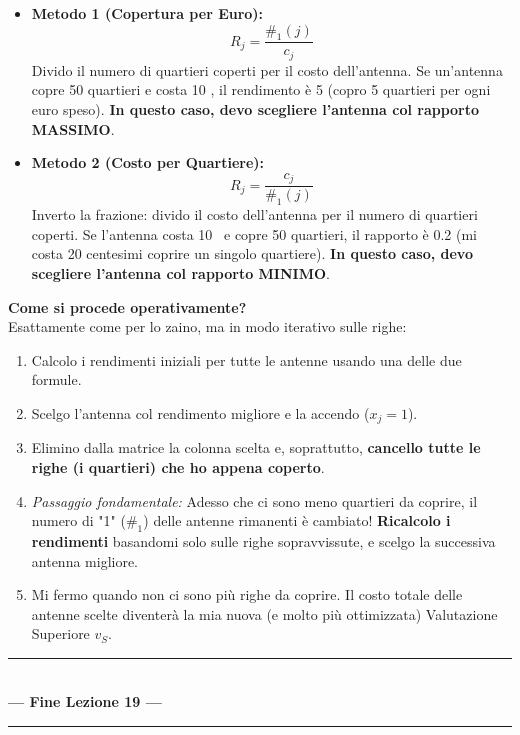 \documentclass[12pt, a4paper]{article}
\begin{document}
	\begin{itemize}[label=$\circ$, itemsep=4pt, leftmargin=1.5cm]
		\item \textbf{Metodo 1 (Copertura per Euro):}
		\[ R_j = \frac{\#_1(j)}{c_j} \]
		Divido il numero di quartieri coperti per il costo dell'antenna. Se un'antenna copre 50 quartieri e costa 10 \texteuro, il rendimento è 5 (copro 5 quartieri per ogni euro speso). \textbf{In questo caso, devo scegliere l'antenna col rapporto MASSIMO}.
		
		\item \textbf{Metodo 2 (Costo per Quartiere):}
		\[ R_j = \frac{c_j}{\#_1(j)} \]
		Inverto la frazione: divido il costo dell'antenna per il numero di quartieri coperti. Se l'antenna costa 10 \texteuro \ e copre 50 quartieri, il rapporto è 0.2 (mi costa 20 centesimi coprire un singolo quartiere). \textbf{In questo caso, devo scegliere l'antenna col rapporto MINIMO}.
	\end{itemize}
	
	\textbf{Come si procede operativamente?}\\
	Esattamente come per lo zaino, ma in modo iterativo sulle righe:
	\begin{enumerate}[label=\arabic*., itemsep=2pt]
		\item Calcolo i rendimenti iniziali per tutte le antenne usando una delle due formule.
		\item Scelgo l'antenna col rendimento migliore e la accendo ($x_j = 1$).
		\item Elimino dalla matrice la colonna scelta e, soprattutto, \textbf{cancello tutte le righe (i quartieri) che ho appena coperto}.
		\item \textit{Passaggio fondamentale:} Adesso che ci sono meno quartieri da coprire, il numero di "1" ($\#_1$) delle antenne rimanenti è cambiato! \textbf{Ricalcolo i rendimenti} basandomi solo sulle righe sopravvissute, e scelgo la successiva antenna migliore.
		\item Mi fermo quando non ci sono più righe da coprire. Il costo totale delle antenne scelte diventerà la mia nuova (e molto più ottimizzata) Valutazione Superiore $v_S$.
	\end{enumerate}
	
	\vspace{1.5cm}
	\begin{center}
		\rule{0.65\textwidth}{1pt} \\
		\vspace{0.4cm}
		\textcolor{titlecolor}{\LARGE \textbf{--- Fine Lezione 19 ---}} \\
		\vspace{0.2cm}
		\rule{0.65\textwidth}{1pt}
	\end{center}
	\newpage
	
\end{document}
